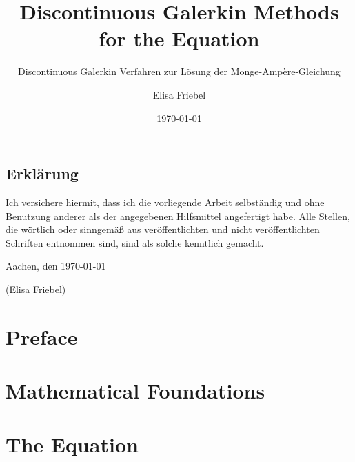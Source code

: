 \documentclass{template}
\title{Discontinuous Galerkin Methods for the \MA Equation}
\subtitle{\Large Discontinuous Galerkin Verfahren zur Lösung der Monge-Amp\`ere-Gleichung}
\author{Elisa Friebel} %
\date{\today}
\begin{document}
\maketitle

\begin{center}
\begin{minipage}[t]{0.8\textwidth}

\chapter*{Erklärung}
Ich versichere hiermit, dass ich die vorliegende Arbeit selbständig und
ohne Benutzung anderer als der angegebenen Hilfsmittel angefertigt habe.
Alle Stellen, die wörtlich oder sinngemäß aus veröffentlichten und nicht
veröffentlichten Schriften entnommen sind, sind als solche kenntlich
gemacht.

\vspace{1cm}
Aachen, den \today

\vspace{2cm}
(Elisa Friebel)
\end{minipage}
\end{center}
\thispagestyle{empty}
\cleardoublepage

\tableofcontents{}

\cleardoublepage
\setcounter{page}{1}


\chapter*{Preface}
\label{ch:preface}


\chapter{Mathematical Foundations}
\label{ch:TheoreticalBackground}



\chapter{The \MA Equation}
\label{ch:MongeAmpereEq}



\end{document}
